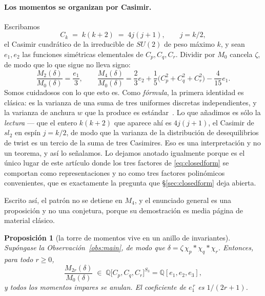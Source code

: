 \documentclass[11pt,a4paper]{article}
\newtheorem{proposicion}{Proposici\'on}
\begin{document}
\paragraph{Los momentos se organizan por Casimir.} Escribamos
\[
C_k \;=\; k(k+2)\;=\;4j(j+1),\qquad j=k/2,
\]
el Casimir cuadr\'atico de la irreducible de $SU(2)$ de peso m\'aximo $k$, y sean $e_1,e_2$ las
funciones sim\'etricas elementales de $C_p,C_q,C_r$. Dividir por $M_0$ cancela $\zeta$, de modo
que lo que sigue no lleva signo:
\begin{equation}\label{eq:casimir}
\boxed{\;
\frac{M_2(\delta)}{M_0(\delta)}=\frac{e_1}{3},
\qquad
\frac{M_4(\delta)}{M_0(\delta)}=\frac{2}{3}e_2+\frac{1}{5}\big(C_p^2+C_q^2+C_r^2\big)
-\frac{4}{15}e_1 .\;}
\end{equation}
Somos cuidadosos con lo que esto es. Como \emph{f\'ormula}, la primera identidad es cl\'asica:
es la varianza de una suma de tres uniformes discretas independientes, y la varianza de anchura
$w$ que la produce es est\'andar~\cite{Neuschel}. Lo que a\~nadimos es s\'olo la \emph{lectura}
--- que el entero $k(k+2)$ que aparece ah\'i es $4j(j+1)$, el Casimir de $sl_2$ en esp\'in
$j=k/2$, de modo que la varianza de la distribuci\'on de desequilibrios de twist es un tercio
de la suma de tres Casimires. Eso es una interpretaci\'on y no un teorema, y as\'i lo
se\~nalamos. Lo dejamos anotado igualmente porque es el \'unico lugar de este art\'iculo donde
los tres factores de \eqref{eq:closedform} se comportan como representaciones y no como tres
factores polin\'omicos convenientes, que es exactamente la pregunta que
\S\ref{sec:closedform} deja abierta.

Escrito as\'i, el patr\'on no se detiene en $M_4$, y el enunciado general es una proposici\'on y
no una conjetura, porque su demostraci\'on es media p\'agina de material cl\'asico.

\begin{proposicion}[la torre de momentos vive en un anillo de invariantes]\label{prop:ring}
Sup\'ongase la Observaci\'on~\ref{obs:main}, de modo que $\delta=\zeta\,\chi_p*\chi_q*\chi_r$.
Entonces, para todo $r\ge0$,
\[
\frac{M_{2r}(\delta)}{M_0(\delta)}\;\in\;
\mathbb{Q}\big[C_p,C_q,C_r\big]^{S_3}=\mathbb{Q}[e_1,e_2,e_3],
\]
y todos los momentos impares se anulan. El coeficiente de $e_1^{\,r}$ es $1/(2r+1)$.
\end{proposicion}
\end{document}
